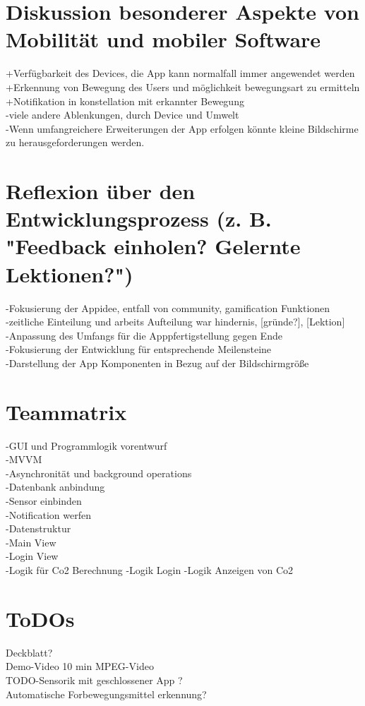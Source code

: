 \documentclass[a4paper,11pt]{article}
\begin{document}
\section{Diskussion besonderer Aspekte von Mobilität und mobiler Software}
+Verfügbarkeit des Devices, die App kann normalfall immer angewendet werden\\
+Erkennung von Bewegung des Users und möglichkeit bewegungsart zu ermitteln\\
+Notifikation in konstellation mit erkannter Bewegung\\
-viele andere Ablenkungen, durch Device und Umwelt\\
-Wenn umfangreichere Erweiterungen der App erfolgen könnte kleine Bildschirme zu herausgeforderungen werden.\\


\section{Reflexion über den Entwicklungsprozess (z. B. "Feedback einholen? Gelernte Lektionen?")}
-Fokusierung der Appidee, entfall von community, gamification Funktionen\\
-zeitliche Einteilung und arbeits Aufteilung war hindernis, [gründe?], [Lektion]\\
-Anpassung des Umfangs für die Apppfertigstellung gegen Ende\\
-Fokusierung der Entwicklung für entsprechende Meilensteine\\
-Darstellung der App Komponenten in Bezug auf der Bildschirmgröße\\


\section{Teammatrix}
-GUI und Programmlogik vorentwurf\\
-MVVM\\
-Asynchronität und background operations\\
-Datenbank anbindung\\
-Sensor einbinden\\
-Notification werfen\\
-Datenstruktur\\
-Main View\\
-Login View\\
-Logik für Co2 Berechnung
-Logik Login
-Logik Anzeigen von Co2


\section{ToDOs}
Deckblatt?\\
Demo-Video 10 min MPEG-Video\\
TODO-Sensorik mit geschlossener App ?\\
Automatische Forbewegungsmittel erkennung?\\
\end{document}
